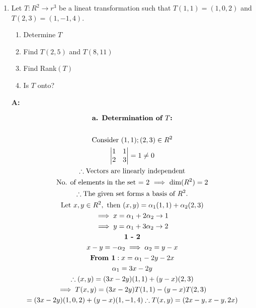 \documentclass[english,course,fleqn]{lecture}
\newenvironment{qanda}{\begin{enumerate}\setlength{\parindent}{0pt}}{\medskip\end{enumerate}}
\newcommand{\Q}{\bigskip\bfseries \item}
\newcommand{\A}{\par\textbf{A:} \normalfont}
\begin{document}
\begin{qanda}
  \begin{gather*}
    \text{\textbf{To verify whether $T$ is onto or not}}\\
    \text{Basis of $P_{n}(R)$ is } \{1, x, x^{2}, x^{3}, \ldots, x^{n}\}\\
   \text{Basis of $R(T)$} = \{x, \frac{x^{2}}{2}, \frac{x^{3}}{3}, \ldots, \frac{x^{n+1}}{n+1}\}\\
    \text{Basis of $P_{n+1}(R)$ is } \{1, x, x^{2}, x^{3}, \ldots, x^{n}, x^{n+1}\}\\
    \text{There is no pre-image for 1}\\
    \therefore \text{$T$ is not onto}
  \end{gather*}

  \Q Let $T:R^{2} \rightarrow r^{3}$ be a lineat transformation such that $T(1,1) = (1,0,2)$ and $T(2,3) = (1,-1, 4)$.

  \begin{enumerate}
    \item Determine $T$ 
    \item Find $T(2,5)$ and $T(8,11)$ 
    \item Find Rank$(T)$
    \item Is $T$ onto?
  \end{enumerate}

  \A

  \begin{gather*}
    \textbf{a. \text{Determination of $T$}:}\\
    \\
    \text{Consider } (1,1); (2,3) \in R^{2}\\
   \begin{vmatrix}
     1 & 1 \\
     2 & 3 \\
   \end{vmatrix} = 1 \ne 0 \\
   \therefore \text{Vectors are linearly independent}\\
   \text{No. of elements in the set = 2 $\implies$ dim$(R^{2}) = 2$}\\
   \therefore \text{The given set forms a basis of $R^{2}$}.\\
   \text{Let } x,y \in R^{2}, \text{ then } (x,y) = \alpha_{1}(1,1) + \alpha_{2}(2,3)\\
   \implies x = \alpha_{1} + 2 \alpha_{2} \rightarrow 1\\
   \implies y = \alpha_{1} + 3 \alpha_{2} \rightarrow 2\\
   \textbf{1 - 2} \\
   x-y = -\alpha_{2} \implies \alpha_{2} = y-x\\ 
   \textbf{\text{From }1}: x = \alpha_{1} - 2y - 2x \\
   \alpha_{1} = 3x - 2y\\
   \therefore (x,y) = (3x - 2y)(1,1) + (y-x)(2,3)\\
   \implies T(x,y) = (3x-2y)T(1,1) - (y-x)T(2,3)\\
   = (3x-2y)(1,0,2) + (y-x)(1,-1,4)
   \therefore T(x,y) = (2x-y, x-y, 2x)
  \end{gather*}


\end{qanda}
\end{document}
